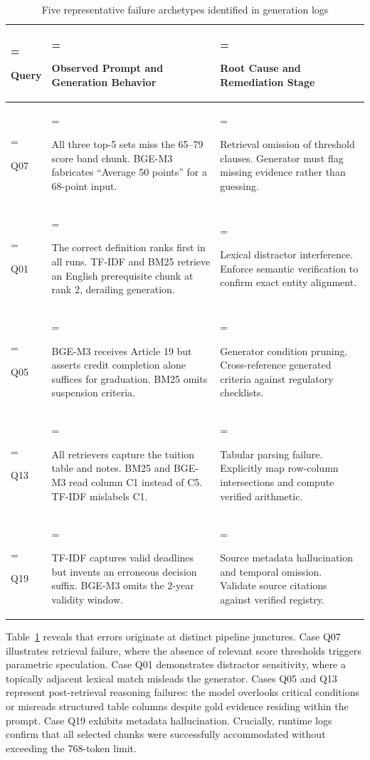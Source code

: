 \documentclass[12pt,a4paper]{article}
\begin{document}
\begin{table}[H]
\centering
\caption{Five representative failure archetypes identified in generation logs}
\label{tab:6}
\footnotesize
\begin{tabularx}{\textwidth}{>{\hsize=0.28\hsize\linewidth=\hsize\raggedright\arraybackslash}X>{\hsize=1.42\hsize\linewidth=\hsize\raggedright\arraybackslash}X>{\hsize=1.30\hsize\linewidth=\hsize\raggedright\arraybackslash}X}
\toprule
\textbf{Query} & \textbf{Observed Prompt and Generation Behavior} & \textbf{Root Cause and Remediation Stage} \\
\midrule
Q07 & All three top-5 sets miss the 65--79 score band chunk. BGE-M3 fabricates ``Average 50 points'' for a 68-point input. & Retrieval omission of threshold clauses. Generator must flag missing evidence rather than guessing. \\
Q01 & The correct definition ranks first in all runs. TF-IDF and BM25 retrieve an English prerequisite chunk at rank 2, derailing generation. & Lexical distractor interference. Enforce semantic verification to confirm exact entity alignment. \\
Q05 & BGE-M3 receives Article 19 but asserts credit completion alone suffices for graduation. BM25 omits suspension criteria. & Generator condition pruning. Cross-reference generated criteria against regulatory checklists. \\
Q13 & All retrievers capture the tuition table and notes. BM25 and BGE-M3 read column C1 instead of C5. TF-IDF mislabels C1. & Tabular parsing failure. Explicitly map row-column intersections and compute verified arithmetic. \\
Q19 & TF-IDF captures valid deadlines but invents an erroneous decision suffix. BGE-M3 omits the 2-year validity window. & Source metadata hallucination and temporal omission. Validate source citations against verified registry. \\
\bottomrule
\end{tabularx}
\end{table}

Table~\ref{tab:6} reveals that errors originate at distinct pipeline junctures. Case Q07 illustrates retrieval failure, where the absence of relevant score thresholds triggers parametric speculation. Case Q01 demonstrates distractor sensitivity, where a topically adjacent lexical match misleads the generator. Cases Q05 and Q13 represent post-retrieval reasoning failures: the model overlooks critical conditions or misreads structured table columns despite gold evidence residing within the prompt. Case Q19 exhibits metadata hallucination. Crucially, runtime logs confirm that all selected chunks were successfully accommodated without exceeding the 768-token limit.
\end{document}

